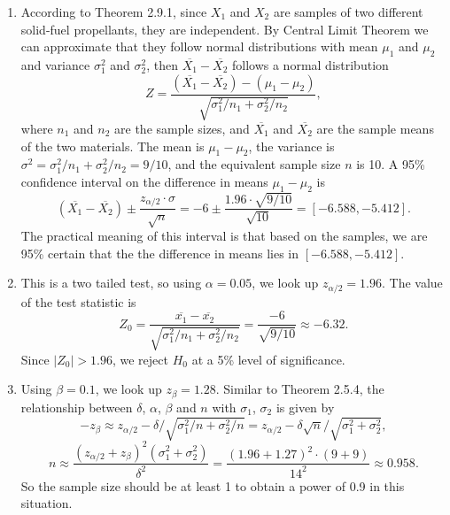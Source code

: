 \documentclass[11pt,a4paper]{article}
\begin{document}
\begin{enumerate}[label=\roman*)]
\item
According to Theorem 2.9.1, since $X_1$ and $X_2$ are samples of two different solid-fuel propellants, they are independent. By Central Limit Theorem we can approximate that they follow normal distributions with mean $\mu_1$ and $\mu_2$ and variance $\sigma_1^2$ and $\sigma_2^2$, then $\overline{X_1}-\overline{X_2}$ follows a normal distribution
$$Z=\frac{(\overline{X_1}-\overline{X_2})-(\mu_1-\mu_2)}{\sqrt{\sigma_1^2/n_1+\sigma_2^2/n_2}},$$ 
where $n_1$ and $n_2$ are the sample sizes, and $\overline{X_1}$ and $\overline{X_2}$ are the sample means of the two materials. The mean is $\mu_1-\mu_2$, the variance is $\sigma^2=\sigma_1^2/n_1+\sigma_2^2/n_2=9/10$, and the equivalent sample size $n$ is 10. A 95\% confidence interval on the difference in means $\mu_1-\mu_2$ is
$$(\overline{X_1}-\overline{X_2})\pm\frac{z_{\alpha/2}\cdot \sigma}{\sqrt{n}}=-6\pm\frac{1.96\cdot\sqrt{9/10}}{\sqrt{10}}=[-6.588,-5.412].$$
The practical meaning of this interval is that based on the samples, we are 95\% certain that the the difference in means lies in $[-6.588,-5.412]$.
\item
This is a two tailed test, so using $\alpha=0.05$, we look up $z_{\alpha/2}=1.96$. The value of the test statistic is
$$Z_0=\frac{\overline{x_1}-\overline{x_2}}{\sqrt{\sigma_1^2/n_1+\sigma_2^2/n_2}}=\frac{-6}{\sqrt{9/10}}\approx-6.32.$$
Since $|Z_0|>1.96$, we reject $H_0$ at a 5\% level of significance.
\item
Using $\beta=0.1$, we look up $z_\beta=1.28$. Similar to Theorem 2.5.4, the relationship between $\delta$, $\alpha$, $\beta$ and $n$ with $\sigma_1$, $\sigma_2$ is given by
$$-z_\beta\approx z_{\alpha/2}-\delta/\sqrt{\sigma_1^2/n+\sigma_2^2/n}=z_{\alpha/2}-\delta\sqrt{n}/\sqrt{\sigma_1^2+\sigma_2^2},$$
$$n\approx\frac{(z_{\alpha/2}+z_\beta)^2(\sigma_1^2+\sigma_2^2)}{\delta^2}=\frac{(1.96+1.27)^2\cdot(9+9)}{14^2}\approx0.958.$$
So the sample size should be at least 1 to obtain a power of 0.9 in this situation.
\end{enumerate}

\subsection{}
\end{document}
